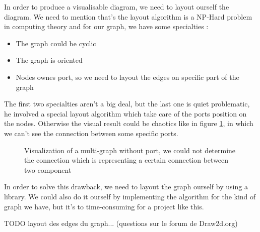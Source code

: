 In order to produce a visualisable diagram, we need to layout ourself the diagram. We need to mention that's the layout algorithm is a NP-Hard problem in computing theory\cite{Tamassia:2007:HGD:1202383} and for our graph, we have some specialties :

\begin{itemize}
  \item The graph could be cyclic
  \item The graph is oriented
  \item Nodes ownes port, so we need to layout the edges on specific part of the graph
\end{itemize}

The first two specialties aren't a big deal, but the last one is quiet problematic, he involved a special layout algorithm which take care of the ports position on the nodes. Otherwise the visual result could be chaotics like in figure \ref{fig:multigraph-no-port}, in which we can't see the connection between some specific ports.

\begin{figure}[h] %
    \centering
    \caption[Visualization of a multi-graph without port]{Visualization of a multi-graph without port, we could not determine the connection which is representing a certain connection between two component}
    \label{fig:multigraph-no-port}
\end{figure} %

In order to solve this drawback, we need to layout the graph ourself by using a library. We could also do it ourself by implementing the algorithm for the kind of graph we have, but it's to time-consuming for a project like this.

TODO layout des edges du graph... (questions sur le forum de Draw2d.org)



